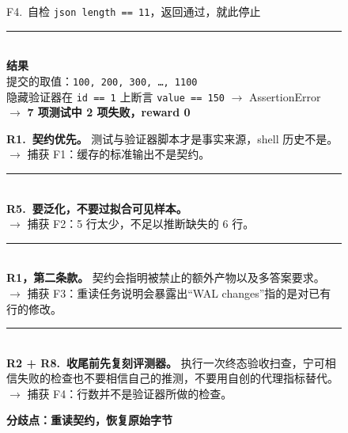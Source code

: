 \begin{figure}[t]
\begin{tcbraster}
\begin{tcolorbox}[colback=aheSky!18,colframe=aheNavy,colbacktitle=aheNavy,
                          title={\scriptsize\textbf{\texttt{chg-1} 之前，NexAU\textsubscript{0} 种子，迭代 1，reward 0.0}}]
            F4.~自检 \texttt{json length == 11}，返回通过，就此停止 \\[3pt]
            \rule{\linewidth}{0.3pt}\\
            \textbf{\textcolor{aheNavy}{结果}} \\
            提交的取值：\texttt{100, 200, 300, \dots, 1100} \\
            隐藏验证器在 \texttt{id == 1} 上断言 \texttt{value == 150} $\rightarrow$ AssertionError \\
            $\rightarrow$ \textbf{7 项测试中 2 项失败，reward 0}
        \end{tcolorbox}
        \begin{tcolorbox}[colback=black!3,colframe=black!65,colbacktitle=black!75,
                          title={\scriptsize\textbf{弥合每处缺口的 \texttt{chg-1} 规则}}]
            \textbf{\textcolor{black!85}{R1.~契约优先。}} 测试与验证器脚本才是事实来源，shell 历史不是。 \\
            \textcolor{black!60}{$\rightarrow$ 捕获 F1：缓存的标准输出不是契约。} \\[3pt]
            \rule{\linewidth}{0.2pt}\\[1pt]
            \textbf{\textcolor{black!85}{R5.~要泛化，不要过拟合可见样本。}} \\
            \textcolor{black!60}{$\rightarrow$ 捕获 F2：5 行太少，不足以推断缺失的 6 行。} \\[3pt]
            \rule{\linewidth}{0.2pt}\\[1pt]
            \textbf{\textcolor{black!85}{R1，第二条款。}} 契约会指明被禁止的额外产物以及多答案要求。 \\
            \textcolor{black!60}{$\rightarrow$ 捕获 F3：重读任务说明会暴露出``WAL changes''指的是对已有行的修改。} \\[3pt]
            \rule{\linewidth}{0.2pt}\\[1pt]
            \textbf{\textcolor{black!85}{R2 + R8.~收尾前先复刻评测器。}} 执行一次终态验收扫查，宁可相信失败的检查也不要相信自己的推测，不要用自创的代理指标替代。 \\
            \textcolor{black!60}{$\rightarrow$ 捕获 F4：行数并不是验证器所做的检查。}
        \end{tcolorbox}
        \begin{tcolorbox}[colback=aheTeal!12,colframe=aheBlue,colbacktitle=aheBlue,
                          title={\scriptsize\textbf{\texttt{chg-1} 之后，相同种子，迭代 2，reward 1.0}}]
            \textbf{\textcolor{aheBlue}{分歧点：重读契约，恢复原始字节}} \\

\end{tcolorbox}
\end{tcbraster}
\end{figure}

